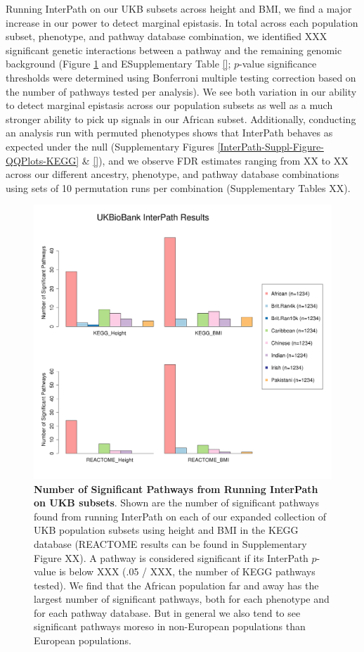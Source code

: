 \documentclass[12pt, a4paper]{article}
\begin{document}
Running InterPath on our UKB subsets across height and BMI, we find a major increase in our power to detect marginal epistasis. In total across each population subset, phenotype, and pathway database combination, we identified XXX significant genetic interactions between a pathway and the remaining genomic background (Figure \ref{InterPath-Main-Figure-Barplots} and ESupplementary Table \ref{}; $p$-value significance thresholds were determined using Bonferroni multiple testing correction based on the number of pathways tested per analysis). We see both variation in our ability to detect marginal epistasis across our population subsets as well as a much stronger ability to pick up signals in our African subset. Additionally, conducting an analysis run with permuted phenotypes shows that InterPath behaves as expected under the null (Supplementary Figures \ref{InterPath-Suppl-Figure-QQPlots-KEGG} \& \ref{}), and we observe FDR estimates ranging from XX to XX across our different ancestry, phenotype, and pathway database combinations using sets of 10 permutation runs per combination (Supplementary Tables XX).

\begin{figure}[htbp]
\centering
\includegraphics[scale=.35]{Images/InterPath_Main_Figure_Barplots_vs1.png}
\caption[TBD]{\textbf{Number of Significant Pathways from Running InterPath on UKB subsets}. Shown are the number of significant pathways found from running InterPath on each of our expanded collection of UKB population subsets using height and BMI in the KEGG database (REACTOME results can be found in Supplementary Figure XX). A pathway is considered significant if its InterPath $p$-value is below XXX (.05 / XXX, the number of KEGG pathways tested). We find that the African population far and away has the largest number of significant pathways, both for each phenotype and for each pathway database. But in general we also tend to see significant pathways moreso in non-European populations than European populations.}
\label{InterPath-Main-Figure-Barplots}
\end{figure}
\end{document}
